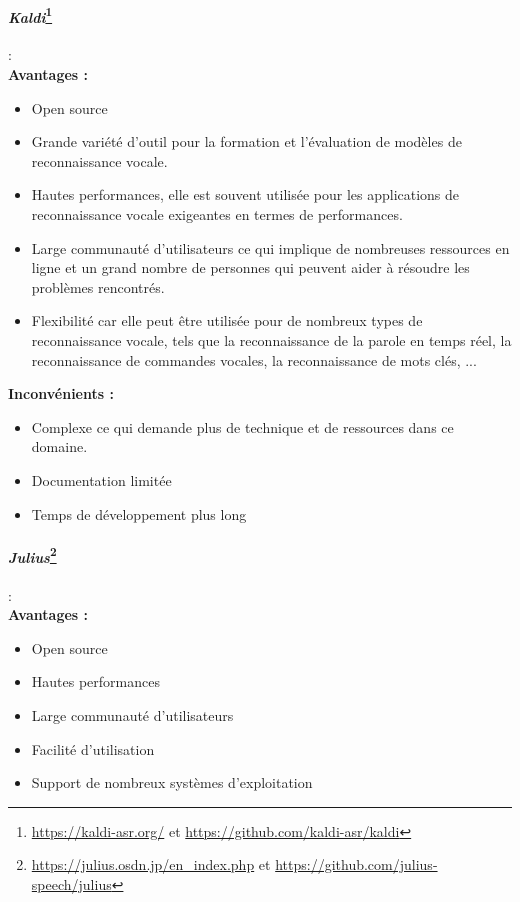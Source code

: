 \paragraph*{\textbf{\textit{Kaldi}}\footnote{\url{https://kaldi-asr.org/} et \url{https://github.com/kaldi-asr/kaldi}}}:\\

\textbf{Avantages :}
\begin{itemize}

    \item Open source
    \item Grande variété d'outil pour la formation et l'évaluation de modèles de reconnaissance vocale.
    \item Hautes performances, elle est souvent utilisée pour les applications de reconnaissance vocale exigeantes en termes de performances.
    \item Large communauté d'utilisateurs ce qui implique de nombreuses ressources en ligne et un grand nombre de personnes qui peuvent aider à résoudre les problèmes rencontrés.
    \item Flexibilité car elle peut être utilisée pour de nombreux types de reconnaissance vocale, tels que la reconnaissance de la parole en temps réel,
          la reconnaissance de commandes vocales, la reconnaissance de mots clés, ...

\end{itemize}

\textbf{Inconvénients :}
\begin{itemize}
    \item Complexe ce qui demande plus de technique et de ressources dans ce domaine.
    \item Documentation limitée
    \item Temps de développement plus long
\end{itemize}

\paragraph*{\textbf{\textit{Julius}}\footnote{\url{https://julius.osdn.jp/en_index.php} et \url{https://github.com/julius-speech/julius}}}: \\

\textbf{Avantages :}
\begin{itemize}
    \item Open source
    \item Hautes performances
    \item Large communauté d'utilisateurs
    \item Facilité d'utilisation
    \item Support de nombreux systèmes d'exploitation
\end{itemize}

